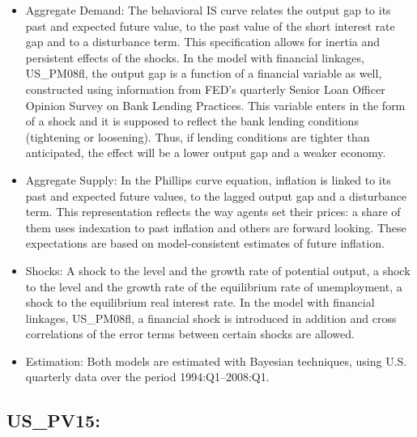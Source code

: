 \documentclass[11pt,a4paper]{article}
\begin{document}
	\begin{itemize}
		
		\item Aggregate Demand: The behavioral IS curve relates the output gap to its past and expected future value, to the past value of the short interest rate gap and to a disturbance term. This specification allows for inertia and persistent effects of the shocks. In the model with financial linkages, {US\_PM08fl}, the output gap is a function of a financial variable as well, constructed using information from FED's quarterly Senior Loan Officer Opinion Survey on Bank Lending Practices. This variable enters in the form of a shock and it is supposed to reflect the bank lending conditions (tightening or loosening). Thus, if lending conditions are tighter than anticipated, the effect will be a lower output gap and a weaker economy.
		
		\item Aggregate Supply: In the Phillips curve equation, inflation is linked to its past and expected future values, to the lagged output gap and a disturbance term. This representation reflects the way agents set their prices: a share of them uses indexation to past inflation and others are forward looking. These expectations are based on model-consistent estimates of future inflation.
		
		\item Shocks: A shock to the level and the growth rate of potential output, a shock to the level and the growth rate of the equilibrium rate of unemployment, a shock to the equilibrium real interest rate. In the model with financial linkages, {US\_PM08fl}, a financial shock is introduced in addition and cross correlations of the error terms between certain shocks are allowed.
		
		\item Estimation: Both models are estimated with Bayesian techniques, using U.S. quarterly data over the period 1994:Q1--2008:Q1.
	\end{itemize}
	
	
	\subsection{US\_PV15: \cite{poutineau2015financial}}
	\label{USPV15}
	
\end{document}
